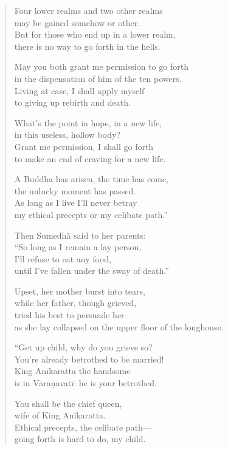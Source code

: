 \documentclass[12pt,openany]{book}%
\begin{document}
\begin{verse}
Four lower realms and two other realms \\
may be gained somehow or other. \\
But for those who end up in a lower realm, \\
there is no way to go forth in the hells. 

May you both grant me permission to go forth \\
in the dispensation of him of the ten powers. \\
Living at ease, I shall apply myself \\
to giving up rebirth and death. 

What’s the point in hope, in a new life, \\
in this useless, hollow body? \\
Grant me permission, I shall go forth \\
to make an end of craving for a new life. 

A Buddha has arisen, the time has come, \\
the unlucky moment has passed. \\
As long as I live I’ll never betray \\
my ethical precepts or my celibate path.” 

Then \textsanskrit{Sumedhā} said to her parents: \\
“So long as I remain a lay person, \\
I’ll refuse to eat any food, \\
until I’ve fallen under the sway of death.” 

Upset, her mother burst into tears, \\
while her father, though grieved, \\
tried his best to persuade her \\
as she lay collapsed on the upper floor of the longhouse. 

“Get up child, why do you grieve so? \\
You’re already betrothed to be married! \\
King \textsanskrit{Anīkaratta} the handsome \\
is in \textsanskrit{Vāraṇavatī}: he is your betrothed. 

You shall be the chief queen, \\
wife of King \textsanskrit{Anīkaratta}. \\
Ethical precepts, the celibate path—\\
going forth is hard to do, my child. 


\end{verse}
\end{document}
